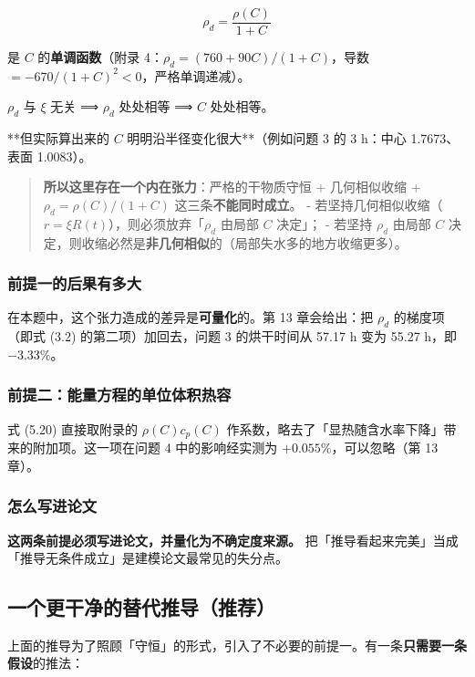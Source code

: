\begin{equation}
\rho_d=\frac{\rho(C)}{1+C}\tag{5.21}
\end{equation}


是 $C$ 的\textbf{单调函数}（附录 4：$\rho_d=(760+90C)/(1+C)$，导数 $=-670/(1+C)^2<0$，严格单调递减）。


$\rho_d$ 与 $\xi$ 无关 ⟹ $\rho_d$ 处处相等 ⟹ $C$ 处处相等。


**但实际算出来的 $C$ 明明沿半径变化很大**（例如问题 3 的 3 h：中心 1.7673、表面 1.0083）。


\begin{quote}
\textbf{所以这里存在一个内在张力}：严格的干物质守恒 + 几何相似收缩 + $\rho_d=\rho(C)/(1+C)$ 这三条\textbf{不能同时成立}。  - 若坚持几何相似收缩（$r=\xi R(t)$），则必须放弃「$\rho_d$ 由局部 $C$ 决定」； - 若坚持 $\rho_d$ 由局部 $C$ 决定，则收缩必然是\textbf{非几何相似}的（局部失水多的地方收缩更多）。
\end{quote}


\subsubsection{前提一的后果有多大}


在本题中，这个张力造成的差异是\textbf{可量化}的。第 13 章会给出：把 $\rho_d$ 的梯度项（即式 (3.2) 的第二项）加回去，问题 3 的烘干时间从 57.17 h 变为 55.27 h，即 $-3.33\%$。


\subsubsection{前提二：能量方程的单位体积热容}


式 (5.20) 直接取附录的 $\rho(C)c_p(C)$ 作系数，略去了「显热随含水率下降」带来的附加项。这一项在问题 4 中的影响经实测为 $+0.055\%$，可以忽略（第 13 章）。


\subsubsection{怎么写进论文}


\textbf{这两条前提必须写进论文，并量化为不确定度来源。} 把「推导看起来完美」当成「推导无条件成立」是建模论文最常见的失分点。


\subsection{一个更干净的替代推导（推荐）}


上面的推导为了照顾「守恒」的形式，引入了不必要的前提一。有一条\textbf{只需要一条假设}的推法：


